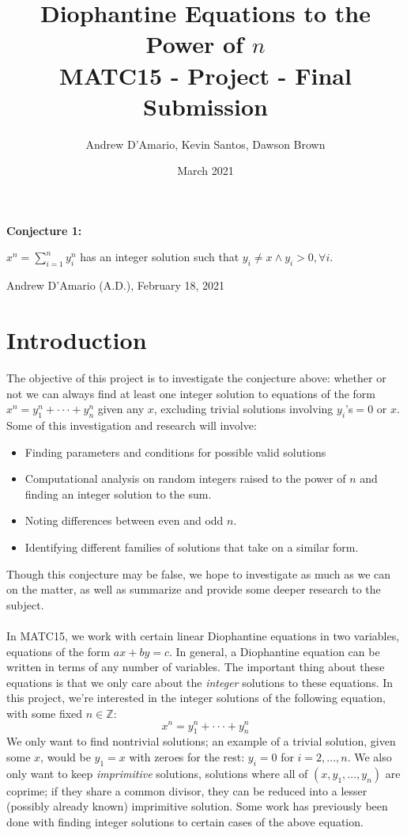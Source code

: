 \documentclass{article}
\title{Diophantine Equations to the Power of $n$ \\ \vspace{.3in} \large{MATC15 - Project - Final Submission}}
\author{Andrew D'Amario, Kevin Santos, Dawson Brown}
\date{March 2021}
\begin{document}
\maketitle

\begin{flushleft}
    {\bf Conjecture 1:}

    \hspace{.5in}$\displaystyle x^n=\sum^{n}_{i=1}y_i^n$ has an integer solution such that $y_i\ne x \land y_i > 0, \forall i$.

    \hspace{2in} Andrew D'Amario (A.D.), February 18, 2021

\section{Introduction}
The objective of this project is to investigate the conjecture above: whether or not we can always find at least one integer solution to equations of the form $x^n=y_1^n+\cdot\cdot\cdot+y_n^n$ given any $x$, excluding trivial solutions involving $y_i$'s$=0$ or $x$. \\
Some of this investigation and research will involve:
\begin{itemize}    
    \item Finding parameters and conditions for possible valid solutions
    \item Computational analysis on random integers raised to the power of $n$ and finding an integer solution to the sum.
    \item Noting differences between even and odd $n$.
    \item Identifying different families of solutions that take on a similar form.
\end{itemize}

Though this conjecture may be false, we hope to investigate as much as we can on the matter, as well as summarize and provide some deeper research to the subject. \\~\\

In MATC15, we work with certain linear Diophantine equations in two variables, equations of the form $ax+by=c$. In general, a Diophantine equation can be written in terms of any number of variables. The important thing about these equations is that we only care about the \textit{integer} solutions to these equations. In this project, we're interested in the integer solutions of the following equation, with some fixed $n \in \mathbb{Z}$:
\begin{equation}
    x^n=y_1^n+\cdot\cdot\cdot+y_n^n
\end{equation}
We only want to find nontrivial solutions; an example of a trivial solution, given some $x$, would be $y_1=x$ with zeroes for the rest: $y_i=0$ for $i=2, ..., n$. We also only want to keep \textit{imprimitive} solutions, solutions where all of $(x,y_1, ..., y_n)$ are coprime; if they share a common divisor, they can be reduced into a lesser (possibly already known) imprimitive solution. Some work has previously been done with finding integer solutions to certain cases of the above equation. 


\end{flushleft}
\end{document}
